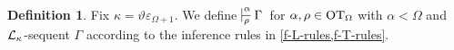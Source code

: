 \documentclass[UKenglish,cleveref,DIV=12]{scrartcl}
\theoremstyle{definition}
\newtheorem{definition}[lemma]{Definition}
\theoremstyle{definition}
\begin{document}
\begin{definition}%
Fix $\kappa=\vartheta\varepsilon_{\Omega+1}$. 
We define $\prov{\alpha}{\rho} \Gamma $ for $\alpha, \rho\in\mathrm{OT}_\Omega$ with $\alpha<\Omega$ and \( \mathcal{L}_\kappa \)-sequent $\Gamma$ according to the inference rules in \cref{f-L-rules,f-T-rules}.
\end{definition}
\end{document}
